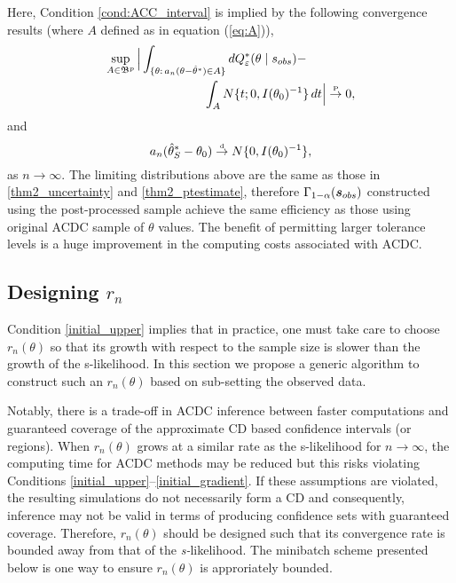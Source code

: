 Here, Condition \ref{cond:ACC_interval} is implied by the following convergence results (where $A$ defined as in equation (\ref{eq:A})),
\begin{eqnarray*}
&\sup_{A\in\mathfrak{B}^{p}}\Big| \int_{\{\btheta: \, a_{n}(\btheta -\hat{\theta}^{*}) \in A\}} d Q_{\veps}^*(\btheta \mid   \bs_{{\rm obs}}) - \qquad \qquad\\ 
&\qquad \qquad\qquad \qquad\int_{A}N\{t;0,I(\btheta_{0})^{-1}\}\,dt\Big|
\stackrel{\hbox{\tiny P}} \rightarrow 0,
\end{eqnarray*}
and 
\[a_{n}(\hat{\theta}_{S}^{*}-\btheta_{0}) \stackrel{\hbox{\tiny d}} \rightarrow  N\{0,I(\btheta_{0})^{-1}\}, \]
as $n\rightarrow\infty$. The limiting distributions above are the same as those in \eqref{thm2_uncertainty} and \eqref{thm2_ptestimate}, therefore $\Gamma_{1-\alpha}(\boldsymbol{s}_{\rm obs})$ constructed using the post-processed sample achieve the same efficiency as those using original ACDC sample of $\theta$ values. The benefit of permitting larger 
tolerance levels is a huge improvement in the computing costs associated with ACDC. 


\subsection{Designing $r_{n}$}\label{sec:rn}
Condition \ref{initial_upper} implies that in practice, one must take care to choose $r_{n}(\theta)$ so that its growth with respect to the sample size is slower than the growth of the s-likelihood. In this section we propose a generic algorithm to construct such an $r_{n}(\theta)$ based on sub-setting the observed data. 

Notably, there is a trade-off in ACDC inference between faster computations and guaranteed coverage of the approximate CD based confidence intervals (or regions). When $r_{n}(\theta)$ grows at a similar rate as the s-likelihood for $n \to \infty$, the computing time for ACDC methods may be reduced but this risks violating Conditions \ref{initial_upper}--\ref{initial_gradient}. If these assumptions are violated, the resulting simulations do not necessarily form a CD and consequently, inference %
may not be valid in terms of producing confidence sets with guaranteed coverage. Therefore, $r_{n}(\theta)$ should be designed such that its convergence rate is bounded away from that of the {\it s-}likelihood. The minibatch scheme presented below is one way to ensure
$r_n(\theta)$ is approriately bounded. 

